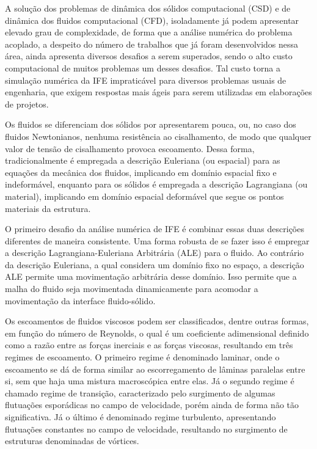 A solução dos problemas de dinâmica dos sólidos computacional (CSD) e de dinâmica dos fluidos computacional (CFD), isoladamente já podem apresentar elevado grau de complexidade, de forma que a análise numérica do problema acoplado, a despeito do número de trabalhos que já foram desenvolvidos nessa área, ainda apresenta diversos desafios a serem superados, sendo o alto custo computacional de muitos problemas um desses desafios. Tal custo torna a simulação numérica da IFE impraticável para diversos problemas usuais de engenharia, que exigem respostas mais ágeis para serem utilizadas em elaborações de projetos.

Os fluidos se diferenciam dos sólidos por apresentarem pouca, ou, no caso dos fluidos Newtonianos, nenhuma resistência ao cisalhamento, de modo que qualquer valor de tensão de cisalhamento provoca escoamento. Dessa forma, tradicionalmente é empregada a descrição Euleriana (ou espacial) para as equações da mecânica dos fluidos, implicando em domínio espacial fixo e indeformável, enquanto para os sólidos é empregada a descrição Lagrangiana (ou material), implicando em domínio espacial deformável que segue os pontos materiais da estrutura.

O primeiro desafio da análise numérica de IFE é combinar essas duas descrições diferentes de maneira consistente. Uma forma robusta de se fazer isso é empregar a descrição Lagrangiana-Euleriana Arbitrária (ALE) \cite{donea1982arbitrary} para o fluido. Ao contrário da descrição Euleriana, a qual considera um domínio fixo no espaço, a descrição ALE permite uma movimentação arbitrária desse domínio. Isso permite que a malha do fluido seja movimentada dinamicamente para acomodar a movimentação da interface fluido-sólido.

Os escoamentos de fluidos viscosos podem ser classificados, dentre outras formas, em função do número de Reynolds, o qual é um coeficiente adimensional definido como a razão entre as forças inerciais e as forças viscosas, resultando em três regimes de escoamento. O primeiro regime é denominado laminar, onde o escoamento se dá de forma similar ao escorregamento de lâminas paralelas entre si, sem que haja uma mistura macroscópica entre elas. Já o segundo regime é chamado regime de transição, caracterizado pelo surgimento de algumas flutuações esporádicas no campo de velocidade, porém ainda de forma não tão significativa. Já o último é denominado regime turbulento, apresentando flutuações constantes no campo de velocidade, resultando no surgimento de estruturas denominadas de vórtices.

